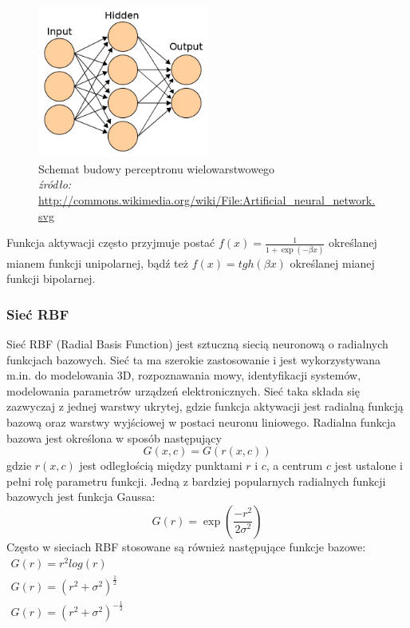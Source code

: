 \begin{figure}
	\centering
	\includegraphics[width=0.5\textwidth]{images/560px-Artificial_neural_network.png}
	\caption{Schemat budowy perceptronu wielowarstwowego \\
	\footnotesize{\textit{źródło:} \url{http://commons.wikimedia.org/wiki/File:Artificial\_neural\_network.svg}} }
	\label{fig:multilayer}
\end{figure}

Funkcja aktywacji często przyjmuje postać $f(x) = \frac{1}{1 + \exp(-\beta x)}$ określanej mianem funkcji unipolarnej, bądź też $f(x) = tgh(\beta x)$ określanej mianej funkcji bipolarnej.
 
\subsubsection*{Sieć RBF}
Sieć RBF (Radial Basis Function) jest sztuczną siecią neuronową o radialnych funkcjach bazowych. Sieć ta ma szerokie zastosowanie i jest wykorzystywana m.in. do modelowania 3D, rozpoznawania mowy, identyfikacji systemów, modelowania parametrów urządzeń elektronicznych\cite{Bors}. Sieć taka składa się zazwyczaj z jednej warstwy ukrytej, gdzie funkcja aktywacji jest radialną funkcją bazową oraz warstwy wyjściowej w postaci neuronu liniowego. Radialna funkcja bazowa jest określona w sposób następujący~\cite{Bartkowiak}
\begin{equation}
	G(x,c) = G(r(x,c))
\end{equation}
gdzie $r(x,c)$ jest odległością między punktami $r$ i $c$, a centrum $c$ jest ustalone i pełni rolę parametru funkcji. Jedną z bardziej popularnych radialnych funkcji bazowych jest funkcja Gaussa:
\begin{equation}
	G(r) = \exp(\frac{-r^2}{2\sigma^2})
\end{equation}
Często w sieciach RBF stosowane są również następujące funkcje bazowe\cite{Chen}: \\
$\begin{array}{l}
 G(r) = r^2 log(r)\\
 G(r) = (r^2 + \sigma^2)^{\frac{1}{2}} \\
 G(r) = (r^2 + \sigma^2)^{-\frac{1}{2}}
\end{array}
$
